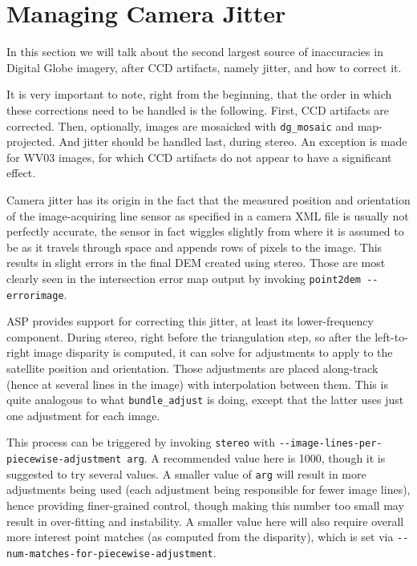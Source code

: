 \section{Managing Camera Jitter}
\label{sec:jitter}

In this section we will talk about the second largest source of
inaccuracies in Digital Globe imagery, after CCD artifacts, namely
jitter, and how to correct it.

It is very important to note, right from the beginning, that the order
in which these corrections need to be handled is the following. First,
CCD artifacts are corrected. Then, optionally, images are mosaicked with
\texttt{dg\_mosaic} and map-projected. And jitter should be handled
last, during stereo. An exception is made for WV03 images, for which CCD
artifacts do not appear to have a significant effect.

Camera jitter has its origin in the fact that the measured position and
orientation of the image-acquiring line sensor as specified in a camera
XML file is usually not perfectly accurate, the sensor in fact wiggles
slightly from where it is assumed to be as it travels through space and
appends rows of pixels to the image. This results in slight errors in
the final DEM created using stereo. Those are most clearly seen in the
intersection error map output by invoking \texttt{point2dem -\/-errorimage}.

ASP provides support for correcting this jitter, at least its
lower-frequency component. During stereo, right before the triangulation
step, so after the left-to-right image disparity is computed, it can
solve for adjustments to apply to the satellite position and
orientation. Those adjustments are placed along-track (hence at several
lines in the image) with interpolation between them. This is quite
analogous to what \texttt{bundle\_adjust} is doing, except that the
latter uses just one adjustment for each image.

This process can be triggered by invoking \texttt{stereo} with
\texttt{-\/-image-lines-per-piecewise-adjustment arg}. A recommended
value here is 1000, though it is suggested to try several values. A
smaller value of \texttt{arg} will result in more adjustments being used
(each adjustment being responsible for fewer image lines), hence
providing finer-grained control, though making this number too small may
result in over-fitting and instability. A smaller value here will also
require overall more interest point matches (as computed from the
disparity), which is set via
\texttt{-\/-num-matches-for-piecewise-adjustment}.

